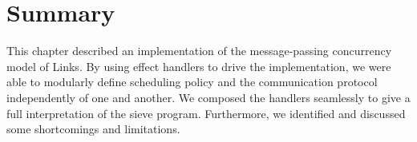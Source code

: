 \documentclass[12pt,mscres,cdtppar,twoside,openright,logo,rightchapter,normalheadings]{infthesis}
\theoremstyle{definition}
\begin{document}
\section{Summary}
This chapter described an implementation of the message-passing
concurrency model of Links. By using effect handlers to drive the
implementation, we were able to modularly define scheduling policy and
the communication protocol independently of one and another. We
composed the handlers seamlessly to give a full interpretation of the
sieve program. Furthermore, we identified and discussed some
shortcomings and limitations.

\end{document}
